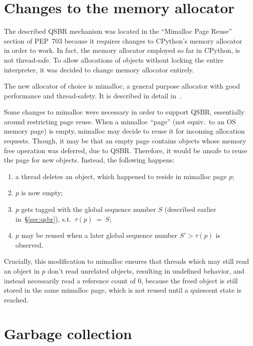 \section{Changes to the memory allocator}\label{sec:mimalloc}

The described QSBR mechanism was located in the ``Mimalloc Page Reuse'' section of PEP~703 because it requires changes to CPython's memory allocator in order to work.
In fact, the memory allocator employed so far in CPython, is not thread-safe.
To allow allocations of objects without locking the entire interpreter, it was decided to change memory allocator entirely.

The new allocator of choice is mimalloc, a general purpose allocator with good performance and thread-safety.
It is described in detail in~\cite{mimalloc}.

Some changes to mimalloc were necessary in order to support QSBR, essentially around restricting page reuse.
When a mimalloc ``page'' (not equiv.\ to an OS memory page) is empty, mimalloc may decide to reuse it for incoming allocation requests.
Though, it may be that an empty page contains objects whose memory free operation was deferred, due to QSBR\@.
Therefore, it would be unsafe to reuse the page for new objects.
Instead, the following happens:
\begin{enumerate}
    \item a thread deletes an object, which happened to reside in mimalloc page $p$;
    \item $p$ is now empty;
    \item $p$ gets tagged with the global sequence number $S$ (described earlier in~\S\ref{sec:qsbr}), s.t.\ $\tau(p)~=~S$;
    \item $p$ may be reused when a later global sequence number $S' > \tau(p)$ is observed.
\end{enumerate}

Crucially, this modification to mimalloc ensures that threads which may still read an object in $p$ don't read unrelated objects, resulting in undefined behavior, and instead necessarily read a reference count of 0, because the freed object is still stored in the same mimalloc page, which is not reused until a quiescent state is reached.


\section{Garbage collection}\label{sec:python-gc}

